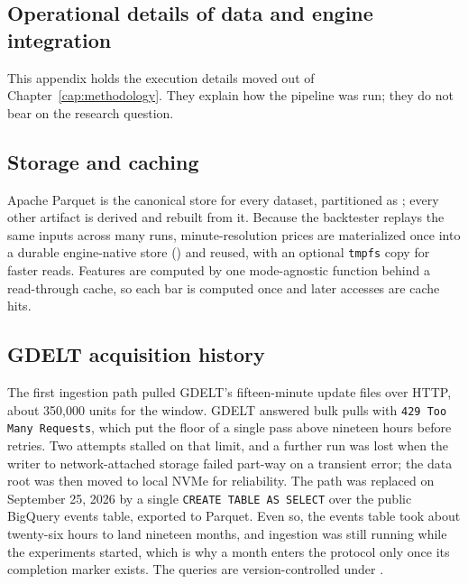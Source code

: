 \begin{apendicesenv}
\partapendices



\chapter{Operational details of data and engine integration} \label{app:operational-details}

This appendix holds the execution details moved out of Chapter~\ref{cap:methodology}. They explain how the pipeline was run; they do not bear on the research question.

\section*{Storage and caching}

Apache Parquet is the canonical store for every dataset, partitioned as ; every other artifact is derived and rebuilt from it. Because the backtester replays the same inputs across many runs, minute-resolution prices are materialized once into a durable engine-native store () and reused, with an optional \texttt{tmpfs} copy for faster reads. Features are computed by one mode-agnostic function behind a read-through cache, so each bar is computed once and later accesses are cache hits.

\section*{GDELT acquisition history}

The first ingestion path pulled GDELT's fifteen-minute update files over HTTP, about 350{,}000 units for the window. GDELT answered bulk pulls with \texttt{429 Too Many Requests}, which put the floor of a single pass above nineteen hours before retries. Two attempts stalled on that limit, and a further run was lost when the writer to network-attached storage failed part-way on a transient error; the data root was then moved to local NVMe for reliability. The path was replaced on September 25, 2026 by a single \texttt{CREATE TABLE AS SELECT} over the public BigQuery events table, exported to Parquet. Even so, the events table took about twenty-six hours to land nineteen months, and ingestion was still running while the experiments started, which is why a month enters the protocol only once its completion marker exists. The queries are version-controlled under .


\end{apendicesenv}
